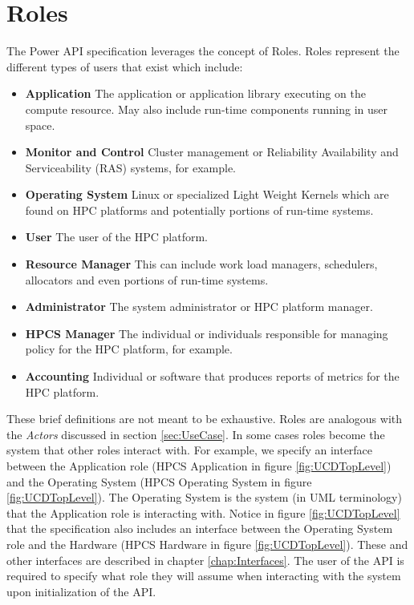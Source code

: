 \section{Roles}\label{sec:Roles}

The Power API specification leverages the concept of Roles. 
Roles represent the different types of users that exist which include:
\begin{itemize}[noitemsep,nolistsep] %
\item{\textbf{Application}  The application or application library executing on the compute resource. May also include run-time components running in user space.}
\item{\textbf{Monitor and Control}  Cluster management or Reliability Availability and Serviceability (RAS) systems, for example.}
\item{\textbf{Operating System} Linux or specialized Light Weight Kernels which are found on HPC platforms and potentially portions of run-time systems. }
\item{\textbf{User} The user of the HPC platform. }
\item{\textbf{Resource Manager} This can include work load managers, schedulers, allocators and even portions of run-time systems. }
\item{\textbf{Administrator} The system administrator or HPC platform manager. }
\item{\textbf{HPCS Manager} The individual or individuals responsible for managing policy for the HPC platform, for example. }
\item{\textbf{Accounting} Individual or software that produces reports of metrics for the HPC platform. }
\end{itemize}
These brief definitions are not meant to be exhaustive.
Roles are analogous with the \textit{Actors} discussed in section \ref{sec:UseCase}.
In some cases roles become the system that other roles interact with.
For example, we specify an interface between the Application role (HPCS Application in figure \ref{fig:UCDTopLevel}) and the Operating System (HPCS Operating System in figure \ref{fig:UCDTopLevel}).
The Operating System is the system (in UML terminology) that the Application role is interacting with. 
Notice in figure \ref{fig:UCDTopLevel} that the specification also includes an interface between the Operating System role and the Hardware (HPCS Hardware in figure \ref{fig:UCDTopLevel}).
These and other interfaces are described in chapter \ref{chap:Interfaces}.
The user of the API is required to specify what role they will assume when interacting with the system upon initialization of the API.

